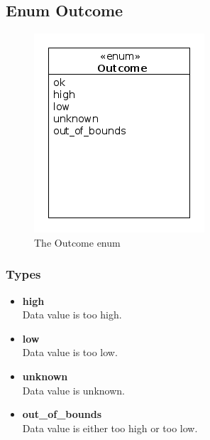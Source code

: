 \subsection{Enum Outcome}
\begin{figure}[htbp]
	\begin{minipage}[t]{8cm}
		\vspace{0pt}
		\centering
		\includegraphics[scale=0.6]{./diagram_pictures/reactor/Outcome.png}
		\caption{The Outcome enum}
	\end{minipage}
	\hfill
	\begin{minipage}[t]{8cm}
		\vspace{10pt}
			
	\end{minipage}
\end{figure}  

\subsubsection{Types}
\begin{itemize}
	\item \textbf{ high }\\
	Data value is too high.
	\item \textbf{ low }\\
	Data value is too low.
	\item \textbf{ unknown }\\
	Data value is unknown.
	\item \textbf{ out\_of\_bounds }\\
	Data value is either too high or too low.
\end{itemize}


\newpage
